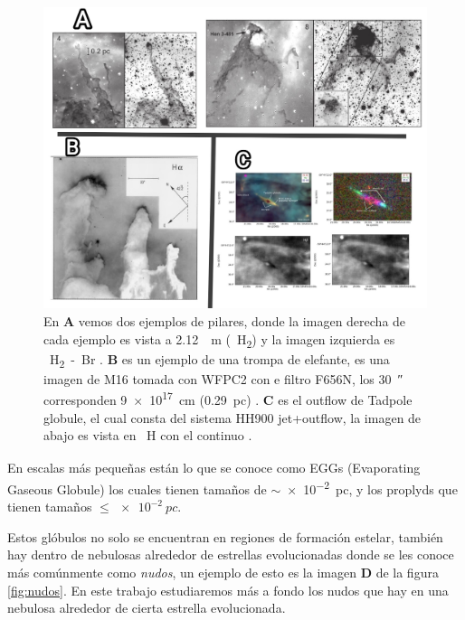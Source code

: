 \documentclass{book}
\begin{document}
\begin{figure}[htb]
    \centering
    \includegraphics[width=1 \textwidth]{images Chapter 1/C1_Pillars.jpg}
    \caption{En \textbf{A} vemos dos ejemplos de pilares, donde la imagen derecha de cada ejemplo es vista a \SI{2.12}{\mu m} (\SI{}{H_2}) y la imagen izquierda es \SI{}{H_2-Br_{\gamma}} \citep{Hartigan:2015}. \textbf{B} es un ejemplo de una trompa de elefante, es una imagen de M16 tomada con WFPC2 con e filtro F656N, los \SI{30}{\arcsecond} corresponden \SI{9e17}{cm} (\SI{0.29}{pc}) \citep{JJHester:1996}. \textbf{C} es el outflow de Tadpole globule, el cual consta del sistema HH900 jet+outflow, la imagen de abajo es vista en \SI{}{H_\alpha} con el continuo 
    \citep{MeganReiter:2019}. }
    \label{fig:Pillars}
\end{figure}

En escalas más pequeñas están lo que se conoce como EGGs (Evaporating Gaseous Globule) los cuales tienen tamaños de $\sim$\SI{e-2}{pc}, y los proplyds que tienen tamaños $\le\SI{e-2}{pc}$. 


Estos glóbulos no solo se encuentran en regiones de formación estelar, también hay dentro de nebulosas alrededor de estrellas evolucionadas donde se les conoce más comúnmente como \textit{nudos}, un ejemplo de esto es la imagen \textbf{D} de la figura \ref{fig:nudos}. En este trabajo estudiaremos más a fondo los nudos que hay en una nebulosa alrededor de cierta estrella evolucionada.
\end{document}
